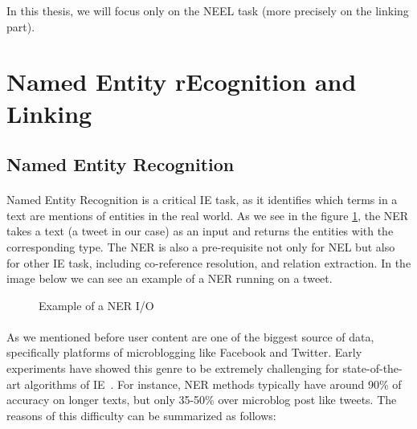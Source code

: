 In this thesis, we will focus only on the NEEL task (more precisely on the linking part).
\section{Named Entity rEcognition and Linking}
\subsection{Named Entity Recognition}
\paragraph{}
Named Entity Recognition is a critical IE task, as it identifies which terms in a text are mentions of entities in the real world.
As we see in the figure \ref{fig:ner_io}, the NER takes a text (a tweet in our case) as an input and returns the entities with the corresponding type. The NER is also a pre-requisite not only for NEL but also for other IE task, including co-reference resolution, and relation extraction. In the image below we can see an example of a NER running on a tweet. \\

\begin{figure}[ht]
\caption{Example of a NER I/O}
\label{fig:ner_io}
\end{figure}

\paragraph{}
As we mentioned before user content are one of the biggest source of data, specifically platforms of microblogging like Facebook and Twitter. Early experiments have showed this genre to be extremely challenging for state-of-the-art algorithms of IE~\cite{derczynski2013microblog}. For instance, NER methods typically have around 90\% of accuracy on longer texts, but only 35-50\% over microblog post like tweets. The reasons of this difficulty can be summarized as follows:

